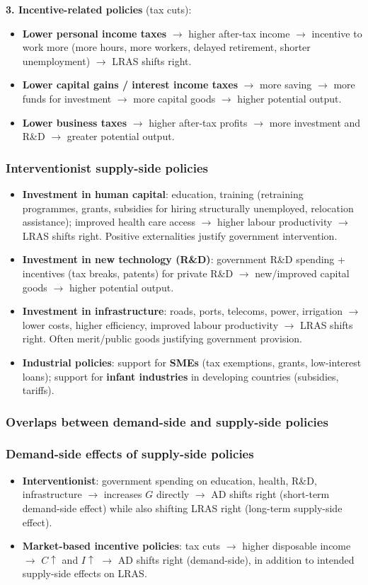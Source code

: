 \documentclass[a4paper,12pt]{article}
\begin{document}
\textbf{3. Incentive-related policies} (tax cuts):
\begin{itemize}
  \item \textbf{Lower personal income taxes} $\to$ higher after-tax income $\to$ incentive to work more (more hours, more workers, delayed retirement, shorter unemployment) $\to$ LRAS shifts right.
  \item \textbf{Lower capital gains / interest income taxes} $\to$ more saving $\to$ more funds for investment $\to$ more capital goods $\to$ higher potential output.
  \item \textbf{Lower business taxes} $\to$ higher after-tax profits $\to$ more investment and R\&D $\to$ greater potential output.
\end{itemize}
\subsubsection*{Interventionist supply-side policies}
\begin{itemize}
  \item \textbf{Investment in human capital}: education, training (retraining programmes, grants, subsidies for hiring structurally unemployed, relocation assistance); improved health care access $\to$ higher labour productivity $\to$ LRAS shifts right. Positive externalities justify government intervention.
  \item \textbf{Investment in new technology (R\&D)}: government R\&D spending + incentives (tax breaks, patents) for private R\&D $\to$ new/improved capital goods $\to$ higher potential output.
  \item \textbf{Investment in infrastructure}: roads, ports, telecoms, power, irrigation $\to$ lower costs, higher efficiency, improved labour productivity $\to$ LRAS shifts right. Often merit/public goods justifying government provision.
  \item \textbf{Industrial policies}: support for \textbf{SMEs} (tax exemptions, grants, low-interest loans); support for \textbf{infant industries} in developing countries (subsidies, tariffs).
\end{itemize}
\subsubsection*{Overlaps between demand-side and supply-side policies}

\subsubsection*{Demand-side effects of supply-side policies}
\begin{itemize}
  \item \textbf{Interventionist}: government spending on education, health, R\&D, infrastructure $\to$ increases $G$ directly $\to$ AD shifts right (short-term demand-side effect) while also shifting LRAS right (long-term supply-side effect).
  \item \textbf{Market-based incentive policies}: tax cuts $\to$ higher disposable income $\to$ $C \uparrow$ and $I \uparrow$ $\to$ AD shifts right (demand-side), in addition to intended supply-side effects on LRAS.
\end{itemize}
\end{document}
